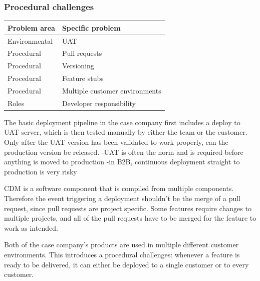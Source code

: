 \documentclass[english]{tktltiki2}
\theoremstyle{definition}
\theoremstyle{remark}
\begin{document}
\subsubsection{Procedural challenges}

\begin{center}
    \begin{tabular}{ | l | p{5cm} |}
    \hline
    Problem area & Specific problem \\ \hline
    Environmental & UAT \\ \hline
   	Procedural & Pull requests \\ \hline
	Procedural & Versioning \\ \hline
	Procedural & Feature stubs \\ \hline
	Procedural & Multiple customer environments \\ \hline
	Roles & Developer responsibility \\
    \hline
    \end{tabular}
\end{center}

The basic deployment pipeline in the case company first includes a deploy to UAT server, which is then tested manually by either the team or the customer. Only after the UAT version has been validated to work properly, can the production version be released. 
-UAT is often the norm and is required before anything is moved to production
-in B2B, continuous deployment straight to production is very risky

CDM is a software component that is compiled from multiple components. Therefore the event triggering a deployment shouldn't be the merge of a pull request, since pull requests are project specific. Some features require changes to multiple projects, and all of the pull requests have to be merged for the feature to work as intended. 

Both of the case company's products are used in multiple different customer environments. This introduces a procedural challenges: whenever a feature is ready to be delivered, it can either be deployed to a single customer or to every customer.

\end{document}
